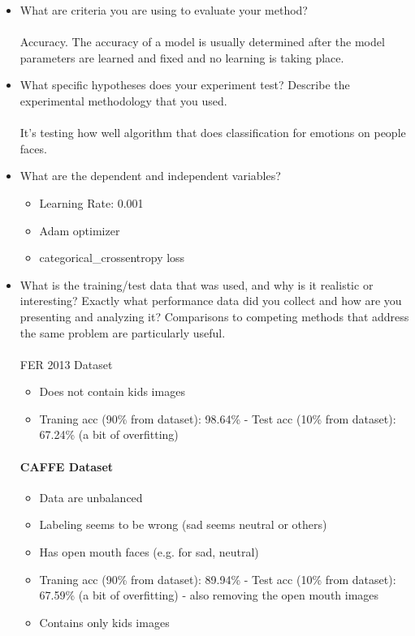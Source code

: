 \documentclass[runningheads,a4paper,11pt]{report}
\begin{document}
\begin{itemize}
	\item What are criteria you are using to evaluate your method?
  \paragraph{}
  Accuracy. The accuracy of a model is usually determined after the model parameters are learned and fixed and no learning is taking place.
	\item What specific hypotheses does your experiment test? Describe the experimental methodology that you used.
  \paragraph{}
  It's testing how well algorithm that does classification for emotions on people faces.
	\item What are the dependent and independent variables?
  \begin{itemize}
    \item Learning Rate: 0.001
    \item Adam optimizer
    \item categorical\_crossentropy loss
  \end{itemize}

	\item What is the training/test data that was used, and why is it realistic or interesting? Exactly what performance data did you collect and how are you presenting and analyzing it? Comparisons to competing methods that address the same problem are particularly useful.
  \paragraph{}{FER 2013 Dataset}

  \begin{itemize}
    \item Does not contain kids images
    \item Traning acc (90\% from dataset): 98.64\% - Test acc (10\% from dataset): 67.24\% (a bit of overfitting)
  \end{itemize}

  \paragraph{CAFFE Dataset}

  \begin{itemize}
    \item Data are unbalanced
    \item Labeling seems to be wrong (sad seems neutral or others)
    \item Has open mouth faces (e.g. for sad, neutral)
    \item Traning acc (90\% from dataset): 89.94\% - Test acc (10\% from dataset): 67.59\% (a bit of overfitting) - also removing the open mouth images
    \item Contains only kids images
  \end{itemize}

\end{itemize}
\end{document}
